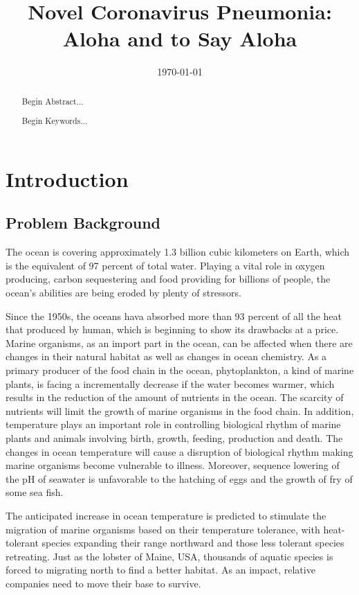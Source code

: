 \documentclass{mcmthesis}
\begin{document}
\linespread{0.6} %
\setlength{\parskip}{0.5\baselineskip} %

\title{Novel Coronavirus Pneumonia: Aloha and to Say Aloha}

\date{\today}
	\begin{abstract}
\hspace{1.2em}
	Begin Abstract...
		\begin{keywords}
			Begin Keywords...
		\end{keywords}
	\end{abstract}


\maketitle

\tableofcontents

\newpage


\section{Introduction}	\label{S1}

\subsection{Problem Background}
	The ocean is covering approximately 1.3 billion cubic kilometers on Earth, which is the equivalent of 97 percent of total water. Playing a vital role in oxygen producing, carbon sequestering and food providing for billions of people, the ocean's abilities are being eroded by plenty of stressors. \par
	Since the 1950s, the oceans hava absorbed more than 93 percent of all the heat that produced by human, which is beginning to show its drawbacks at a price. Marine organisms, as an import part in the ocean, can be affected when there are changes in their natural habitat as well as changes in ocean chemistry. As a primary producer of the food chain in the ocean, phytoplankton, a kind of marine plants, is facing a incrementally decrease if the water becomes warmer, which results in the reduction of the amount of nutrients in the ocean. The scarcity of nutrients will limit the growth of marine organisms in the food chain. In addition, temperature plays an important role in controlling biological rhythm of marine plants and animals involving birth, growth, feeding, production and death. The changes in ocean temperature will cause a disruption of biological rhythm making marine organisms become vulnerable to illness. Moreover, sequence lowering of the pH of seawater is unfavorable to the hatching of eggs and the growth of fry of some sea fish.\par
	The anticipated increase in ocean temperature is predicted to stimulate the migration of marine organisms based on their temperature tolerance, with heat-tolerant species expanding their range northward and those less tolerant species retreating. Just as the lobster of Maine, USA, thousands of aquatic species is forced to migrating north to find a better habitat. As an impact, relative companies need to move their base to survive. \par
	
\end{document}
